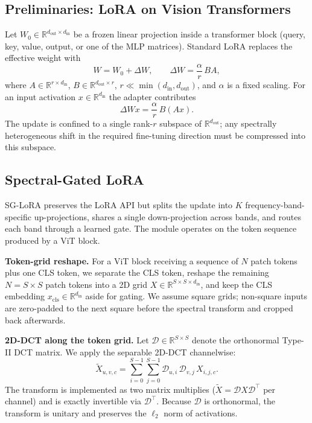 \documentclass{article}
\begin{document}
\subsection{Preliminaries: LoRA on Vision Transformers}

Let $W_0 \in \mathbb{R}^{d_{\text{out}} \times d_{\text{in}}}$ be a frozen linear projection inside a transformer block (query, key, value, output, or one of the MLP matrices). Standard LoRA  replaces the effective weight with
\begin{equation}
W = W_0 + \Delta W, \qquad \Delta W = \frac{\alpha}{r}\, B A,
\end{equation}
where $A \in \mathbb{R}^{r \times d_{\text{in}}}$, $B \in \mathbb{R}^{d_{\text{out}} \times r}$, $r \ll \min(d_{\text{in}}, d_{\text{out}})$, and $\alpha$ is a fixed scaling. For an input activation $x \in \mathbb{R}^{d_{\text{in}}}$ the adapter contributes
\begin{equation}
\Delta W x = \frac{\alpha}{r}\, B (A x).
\end{equation}
The update is confined to a single rank-$r$ subspace of $\mathbb{R}^{d_{\text{out}}}$; any spectrally heterogeneous shift in the required fine-tuning direction must be compressed into this subspace.

\subsection{Spectral-Gated LoRA}

SG-LoRA preserves the LoRA API but splits the update into $K$ frequency-band-specific up-projections, shares a single down-projection across bands, and routes each band through a learned gate. The module operates on the token sequence produced by a ViT block.

\textbf{Token-grid reshape.} For a ViT block receiving a sequence of $N$ patch tokens plus one CLS token, we separate the CLS token, reshape the remaining $N = S \times S$ patch tokens into a 2D grid $X \in \mathbb{R}^{S \times S \times d_{\text{in}}}$, and keep the CLS embedding $x_{\text{cls}} \in \mathbb{R}^{d_{\text{in}}}$ aside for gating. We assume square grids; non-square inputs are zero-padded to the next square before the spectral transform and cropped back afterwards.

\textbf{2D-DCT along the token grid.} Let $\mathcal{D} \in \mathbb{R}^{S \times S}$ denote the orthonormal Type-II DCT matrix. We apply the separable 2D-DCT channelwise:
\begin{equation}
\tilde{X}_{u,v,c} = \sum_{i=0}^{S-1} \sum_{j=0}^{S-1} \mathcal{D}_{u,i}\, \mathcal{D}_{v,j}\, X_{i,j,c}.
\end{equation}
The transform is implemented as two matrix multiplies ($\tilde{X} = \mathcal{D} X \mathcal{D}^\top$ per channel) and is exactly invertible via $\mathcal{D}^\top$. Because $\mathcal{D}$ is orthonormal, the transform is unitary and preserves the $\ell_2$ norm of activations.
\end{document}
